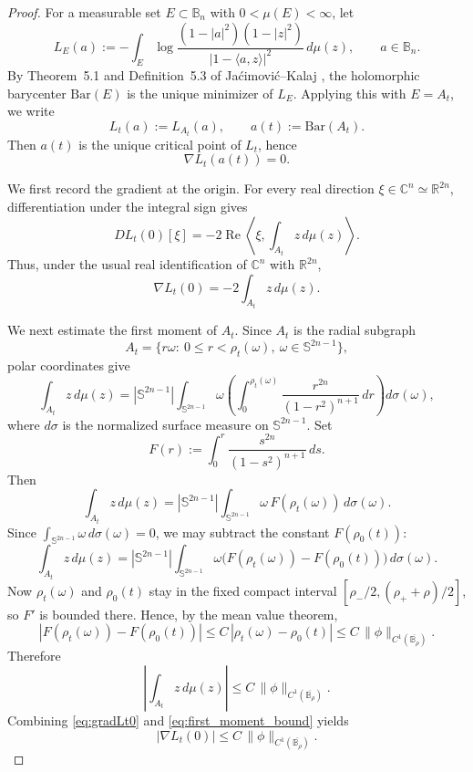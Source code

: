 \documentclass[11pt]{amsart}
\theoremstyle{plain}
\theoremstyle{definition}
\theoremstyle{remark}
\newcommand{\B}{\mathbb{B}}
\newcommand{\Sn}{\mathbb{S}^{2n-1}}
\newcommand{\R}{\mathbb{R}}
\newcommand{\C}{\mathbb{C}}
\begin{document}
\begin{proof}
For a measurable set \(E\subset\B_n\) with \(0<\mu(E)<\infty\), let
\[
L_E(a):=
-\int_E
\log\frac{(1-|a|^2)(1-|z|^2)}{|1-\langle a,z\rangle|^2}\,d\mu(z),
\qquad a\in\B_n.
\]
By Theorem~5.1 and Definition~5.3 of Ja\'cimovi\'c--Kalaj \cite{JacimovicKalajAnnFennMath},
the holomorphic barycenter \(\mathrm{Bar}(E)\) is the unique minimizer of \(L_E\).
Applying this with \(E=A_t\), we write
\[
L_t(a):=L_{A_t}(a),
\qquad
a(t):=\mathrm{Bar}(A_t).
\]
Then \(a(t)\) is the unique critical point of \(L_t\), hence
\[
\nabla L_t(a(t))=0.
\]

We first record the gradient at the origin. For every real direction
$\xi\in\C^n\simeq\R^{2n}$, differentiation under the integral sign gives
\[
 DL_t(0)[\xi]=-2\operatorname{Re}
 \left\langle\xi,\int_{A_t}z\,d\mu(z)\right\rangle.
\]
Thus, under the usual real identification of $\C^n$ with $\R^{2n}$,
\begin{equation}\label{eq:gradLt0}
\nabla L_t(0)=-2\int_{A_t} z\,d\mu(z).
\end{equation}

We next estimate the first moment of \(A_t\).
Since \(A_t\) is the radial subgraph
\[
A_t=\{r\omega:\ 0\le r<\rho_t(\omega),\ \omega\in\Sn\},
\]
polar coordinates give
\[
\int_{A_t} z\,d\mu(z)
=
|\Sn|\int_{\Sn}\omega
\left(\int_0^{\rho_t(\omega)} \frac{r^{2n}}{(1-r^2)^{n+1}}\,dr\right)d\sigma(\omega),
\]
where $d\sigma$ is the normalized surface measure on \(\Sn\).
Set
\[
F(r):=\int_0^r \frac{s^{2n}}{(1-s^2)^{n+1}}\,ds.
\]
Then
\[
\int_{A_t} z\,d\mu(z)
=
|\Sn|\int_{\Sn}\omega\,F(\rho_t(\omega))\,d\sigma(\omega).
\]
Since \(\int_{\Sn}\omega\,d\sigma(\omega)=0\), we may subtract the constant \(F(\rho_0(t))\):
\[
\int_{A_t} z\,d\mu(z)
=
|\Sn|\int_{\Sn}\omega\bigl(F(\rho_t(\omega))-F(\rho_0(t))\bigr)\,d\sigma(\omega).
\]
Now \(\rho_t(\omega)\) and \(\rho_0(t)\) stay in the fixed compact interval
\(
[\rho_-/2,(\rho_++\rho)/2]
\),
so \(F'\) is bounded there. Hence, by the mean value theorem,
\[
|F(\rho_t(\omega))-F(\rho_0(t))|
\le
C\,|\rho_t(\omega)-\rho_0(t)|
\le
C\,\|\phi\|_{C^1(\overline{\B_\rho})}.
\]
Therefore
\begin{equation}\label{eq:first_moment_bound}
\left|\int_{A_t} z\,d\mu(z)\right|
\le
C\,\|\phi\|_{C^1(\overline{\B_\rho})}.
\end{equation}
Combining \eqref{eq:gradLt0} and \eqref{eq:first_moment_bound} yields
\begin{equation}\label{eq:gradLt0_bound}
|\nabla L_t(0)|
\le
C\,\|\phi\|_{C^1(\overline{\B_\rho})}.
\end{equation}


\end{proof}
\end{document}
